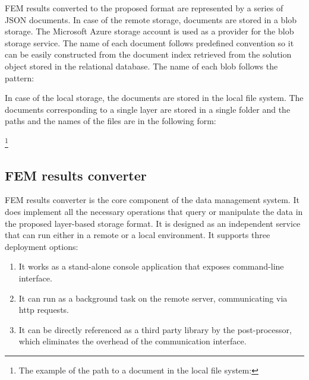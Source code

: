 FEM results converted to the proposed format are represented by a series of JSON documents. In case of the remote storage, documents are stored in a blob storage. The Microsoft Azure storage account is used as a provider for the blob storage service. The name of each document follows predefined convention so it can be easily constructed from the document index retrieved from the solution object stored in the relational database. The name of each blob follows the pattern:


\noindent
In case of the local storage, the documents are stored in the local file system. The documents corresponding to a single layer are stored in a single folder and the paths and the names of the files are in the following form:

\footnote{The example of the path to a document in the local file system:\par {}}

\subsection*{FEM results converter}

FEM results converter is the core component of the data management system. It does implement all the necessary operations that query or manipulate the data in the proposed layer-based storage format. It is designed as an independent service that can run either in a remote or a local environment. It supports three deployment options:

\begin{enumerate}
    \item It works as a stand-alone console application that exposes command-line interface.
    \item It can run as a background task on the remote server, communicating via http requests.
    \item It can be directly referenced as a third party library by the post-processor, which eliminates the overhead of the communication interface.
\end{enumerate}

